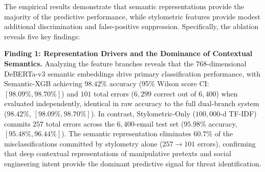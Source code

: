 \documentclass[journal]{IEEEtran}
\begin{document}
\begin{table}[!t]
\vspace{0.15cm}
\end{table}

The empirical results demonstrate that semantic representations provide the majority of the predictive performance, while stylometric features provide modest additional discrimination and false-positive suppression. Specifically, the ablation reveals five key findings:

\textbf{Finding 1: Representation Drivers and the Dominance of Contextual Semantics.} Analyzing the feature branches reveals that the $768$-dimensional DeBERTa-v3 semantic embeddings drive primary classification performance, with Semantic-XGB achieving $98.42\%$ accuracy (95\% Wilson score CI: $[98.09\%, 98.70\%]$) and $101$ total errors ($6{,}299$ correct out of $6{,}400$) when evaluated independently, identical in raw accuracy to the full dual-branch system ($98.42\%$, $[98.09\%, 98.70\%]$). In contrast, Stylometric-Only ($100{,}000$-d TF-IDF) commits $257$ total errors across the $6,400$-email test set ($95.98\%$ accuracy, $[95.48\%, 96.44\%]$). The semantic representation eliminates $60.7\%$ of the misclassifications committed by stylometry alone ($257 \to 101$ errors), confirming that deep contextual representations of manipulative pretexts and social engineering intent provide the dominant predictive signal for threat identification.
\end{document}
